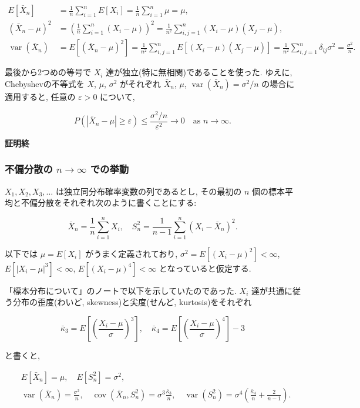 \documentclass[
  letterpaper,
  DIV=11,
  numbers=noendperiod]{scrartcl}
\begin{document}
\[
\begin{aligned}
E[\bar{X}_n] &= \frac{1}{n}\sum_{i=1}^n E[X_i]
= \frac{1}{n}\sum_{i=1}^n \mu = \mu,
\\
(\bar{X}_n - \mu)^2 &=
\left(\frac{1}{n}\sum_{i=1}^n(X_i-\mu)\right)^2 =
\frac{1}{n^2}\sum_{i,j=1}^n (X_i-\mu)(X_j-\mu),
\\
\operatorname{var}(\bar{X}_n) &=
E[(\bar{X}_n - \mu)^2] =
\frac{1}{n^2}\sum_{i,j=1}^n E[(X_i-\mu)(X_j-\mu)] =
\frac{1}{n^2}\sum_{i,j=1}^n \delta_{ij}\sigma^2 =
\frac{\sigma^2}{n}.
\end{aligned}
\]

最後から2つめの等号で \(X_i\) 達が独立(特に無相関)であることを使った.
ゆえに, Chebyshevの不等式を \(X\), \(\mu\), \(\sigma^2\) がそれぞれ
\(\bar{X}_n\), \(\mu\), \(\operatorname{var}(\bar{X}_n)=\sigma^2/n\)
の場合に適用すると, 任意の \(\varepsilon>0\) について,

\[
P(|\bar{X}_n - \mu|\ge\varepsilon) \le \frac{\sigma^2/n}{\varepsilon^2} \to 0 \quad \text{as $n\to\infty$}.
\]

\textbf{証明終}

\hypertarget{ux4e0dux504fux5206ux6563ux306e-ntoinfty-ux3067ux306eux6319ux52d5}{%
\subsubsection{\texorpdfstring{不偏分散の \(n\to\infty\)
での挙動}{不偏分散の n\textbackslash to\textbackslash infty での挙動}}\label{ux4e0dux504fux5206ux6563ux306e-ntoinfty-ux3067ux306eux6319ux52d5}}

\(X_1,X_2,X_3,\ldots\) は独立同分布確率変数の列であるとし, その最初の
\(n\) 個の標本平均と不偏分散をそれぞれ次のように書くことにする:

\[
\bar{X}_n = \frac{1}{n}\sum_{i=1}^n X_i, \quad
S_n^2 = \frac{1}{n-1}\sum_{i=1}^n (X_i - \bar{X}_n)^2.
\]

以下では \(\mu=E[X_i]\) がうまく定義されており,
\(\sigma^2=E[(X_i-\mu)^2]<\infty\), \(E[|X_i-\mu|^3]<\infty\),
\(E[(X_i-\mu)^4]<\infty\) となっていると仮定する.

「標本分布について」のノートで以下を示していたのであった. \(X_i\)
達が共通に従う分布の歪度(わいど, skewness)と尖度(せんど,
kurtosis)をそれぞれ

\[
\bar\kappa_3 = E\left[\left(\frac{X_i-\mu}{\sigma}\right)^3\right], \quad
\bar\kappa_4 = E\left[\left(\frac{X_i-\mu}{\sigma}\right)^4\right] - 3
\]

と書くと,

\[
\begin{aligned}
&
E[\bar{X}_n] = \mu, \quad
E[S_n^2] = \sigma^2,
\\ &
\operatorname{var}(\bar{X}_n) = \frac{\sigma^2}{n}, \quad
\operatorname{cov}(\bar{X}_n, S_n^2) = \sigma^3\frac{\bar\kappa_3}{n}, \quad
\operatorname{var}(S_n^2) = \sigma^4\left(\frac{\bar\kappa_4}{n} + \frac{2}{n-1}\right).
\end{aligned}
\]
\end{document}
